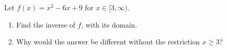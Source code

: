 Let $f(x)=x^2-6x+9$ for $x\in[3,\infty)$.
\begin{enumerate}
\item[(a)] Find the inverse of $f$, with its domain.
\item[(b)] Why would the answer be different without the restriction $x\ge3$?
\end{enumerate}
